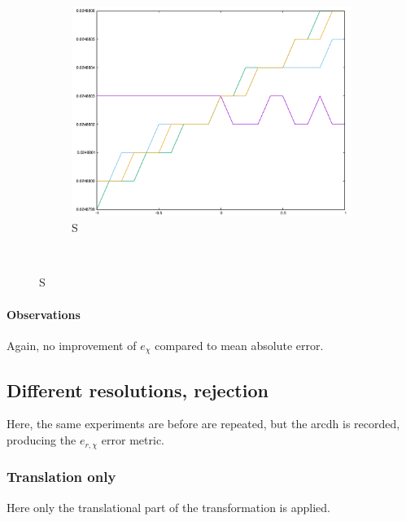 \begin{figure}[H]
\begin{subfigure}{.33\textwidth}
	\includegraphics[width=\linewidth]{fig/ajherr/t3r/S_mae.pdf}
	\caption{S}
\end{subfigure}\\
\end{figure}


\paragraph{Observations} Again, no improvement of $e_{\chi}$ compared to mean absolute error.


\newpage

\subsection{Different resolutions, rejection}
Here, the same experiments are before are repeated, but the \gls{arcdh} is recorded, producing the $e_{r,\chi}$ error metric.


\subsubsection{Translation only}
Here only the translational part of the transformation is applied.

